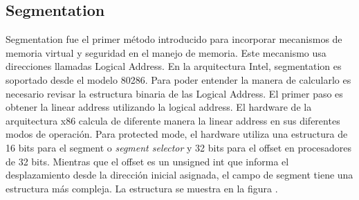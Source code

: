 \subsection{Segmentation}

Segmentation fue el primer método introducido para incorporar mecanismos de
memoria virtual y seguridad en el manejo de memoria. Este mecanismo usa
direcciones llamadas Logical Address. En la arquitectura Intel, segmentation es
soportado desde el modelo 80286. Para poder entender la manera de calcularlo es
necesario revisar la estructura binaria de las Logical Address.  El primer paso
es obtener la linear address utilizando la logical address. El hardware de la
arquitectura x86 calcula de diferente manera la linear address en sus
diferentes modos de operación. Para protected mode, el hardware utiliza una
estructura de 16 bits para el segment o \emph{segment selector} y 32 bits para
el offset en procesadores de 32 bits. Mientras que el offset es un unsigned int
que informa el desplazamiento desde la dirección inicial asignada, el campo de
segment tiene una estructura más compleja. La estructura se muestra en la
figura .

